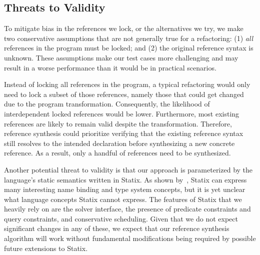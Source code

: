 \subsection{Threats to Validity}
To mitigate bias in the references we lock, or the alternatives we try, we make two conservative assumptions that are not generally true for a refactoring:
(1) \emph{all} references in the program must be locked; and
(2) the original reference syntax is unknown.
These assumptions make our test cases more challenging and may result in a worse performance than it would be in practical scenarios.

Instead of locking all references in the program, a typical refactoring would only need to lock a subset of those references, namely those that could get changed due to the program transformation.
Consequently, the likelihood of interdependent locked references would be lower.
Furthermore, most existing references are likely to remain valid despite the transformation.
Therefore, reference synthesis could prioritize verifying that the existing reference syntax still resolves to the intended declaration before synthesizing a new concrete reference.
As a result, only a handful of references need to be synthesized.


Another potential threat to validity is that our approach is parameterized by the language's static semantics written in Statix.
As shown by~\citet{RouvoetAPKV20, AntwerpenPRV18, ZwaanP24-0}, Statix can express many interesting name binding and type system concepts, but it is yet unclear what language concepts Statix cannot express.
The features of Statix that we heavily rely on are the solver interface, the presence of predicate constraints and query constraints, and conservative scheduling.
Given that we do not expect significant changes in any of these, we expect that our reference synthesis algorithm will work without fundamental modifications being required by possible future extensions to Statix.




